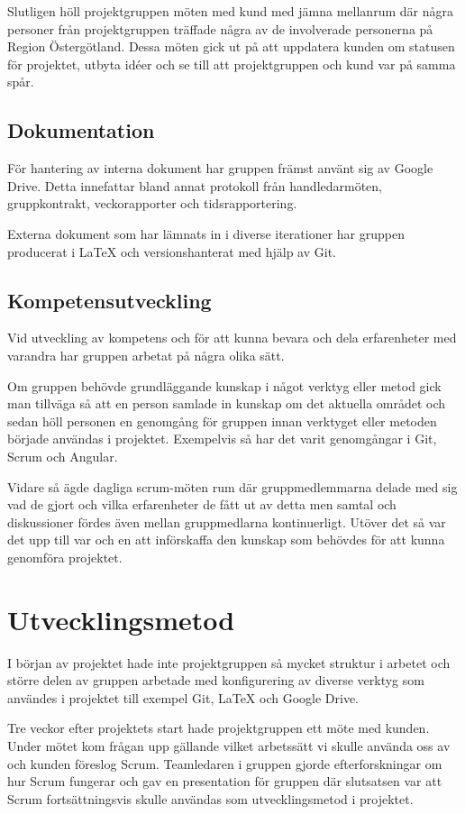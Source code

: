 Slutligen höll projektgruppen möten med kund med jämna mellanrum där några personer från projektgruppen träffade några av de involverade personerna på Region Östergötland. Dessa möten gick ut på att uppdatera kunden om statusen för projektet, utbyta idéer och se till att projektgruppen och kund var på samma spår.

\subsection{Dokumentation}
För hantering av interna dokument har gruppen främst använt sig av Google Drive. Detta innefattar bland annat protokoll från handledarmöten, gruppkontrakt, veckorapporter och tidsrapportering.

Externa dokument som har lämnats in i diverse iterationer har gruppen producerat i LaTeX och versionshanterat med hjälp av Git.

\subsection{Kompetensutveckling}
Vid utveckling av kompetens och för att kunna bevara och dela erfarenheter med varandra har gruppen arbetat på några olika sätt.

Om gruppen behövde grundläggande kunskap i något verktyg eller metod gick man tillväga så att en person samlade in kunskap om det aktuella området och sedan höll personen en genomgång för gruppen innan verktyget eller metoden började användas i projektet. Exempelvis så har det varit genomgångar i Git, Scrum och Angular. 

Vidare så ägde dagliga scrum-möten rum där gruppmedlemmarna delade med sig vad de gjort och vilka erfarenheter de fått ut av detta men samtal och diskussioner fördes även mellan gruppmedlarna kontinuerligt. Utöver det så var det upp till var och en att införskaffa den kunskap som behövdes 
för att kunna genomföra projektet.  

\section{Utvecklingsmetod}
I början av projektet hade inte projektgruppen så mycket struktur i arbetet och större delen av gruppen arbetade med konfigurering av diverse verktyg som användes i projektet till exempel Git, LaTeX och Google Drive.

Tre veckor efter projektets start hade projektgruppen ett möte med kunden. Under mötet kom frågan upp gällande vilket arbetssätt vi skulle använda oss av och kunden föreslog Scrum. Teamledaren i gruppen gjorde efterforskningar om hur Scrum fungerar och gav en presentation för gruppen där slutsatsen var att Scrum fortsättningsvis skulle användas som utvecklingsmetod i projektet.

